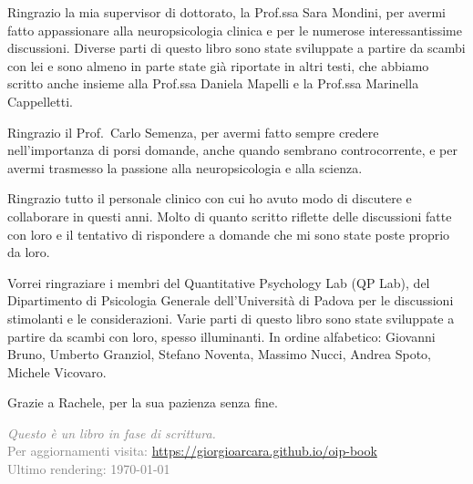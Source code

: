 \documentclass[
  italian,
  letterpaper,
  paper=A4,
  headinclude=on,
  footinclude=on,
  12pt]{scrbook}
\begin{document}
Ringrazio la mia supervisor di dottorato, la Prof.ssa Sara Mondini, per
avermi fatto appassionare alla neuropsicologia clinica e per le numerose
interessantissime discussioni. Diverse parti di questo libro sono state
sviluppate a partire da scambi con lei e sono almeno in parte state già
riportate in altri testi, che abbiamo scritto anche insieme alla
Prof.ssa Daniela Mapelli e la Prof.ssa Marinella Cappelletti.

Ringrazio il Prof.~Carlo Semenza, per avermi fatto sempre credere
nell'importanza di porsi domande, anche quando sembrano controcorrente,
e per avermi trasmesso la passione alla neuropsicologia e alla scienza.

Ringrazio tutto il personale clinico con cui ho avuto modo di discutere
e collaborare in questi anni. Molto di quanto scritto riflette delle
discussioni fatte con loro e il tentativo di rispondere a domande che mi
sono state poste proprio da loro.

Vorrei ringraziare i membri del Quantitative Psychology Lab (QP Lab),
del Dipartimento di Psicologia Generale dell'Università di Padova per le
discussioni stimolanti e le considerazioni. Varie parti di questo libro
sono state sviluppate a partire da scambi con loro, spesso illuminanti.
In ordine alfabetico: Giovanni Bruno, Umberto Granziol, Stefano Noventa,
Massimo Nucci, Andrea Spoto, Michele Vicovaro.

Grazie a Rachele, per la sua pazienza senza fine.


\backmatter

\clearpage
\ifodd\value{page}\hbox{}\newpage\fi
\begin{center}
\textcolor{gray}{\Large
\textit{Questo è un libro in fase di scrittura.}\\
Per aggiornamenti visita: \url{https://giorgioarcara.github.io/oip-book}\\
Ultimo rendering: \today\  \currenttime
}
\end{center}
\clearpage
\ifodd\value{page}\hbox{}\newpage\fi

\end{document}
